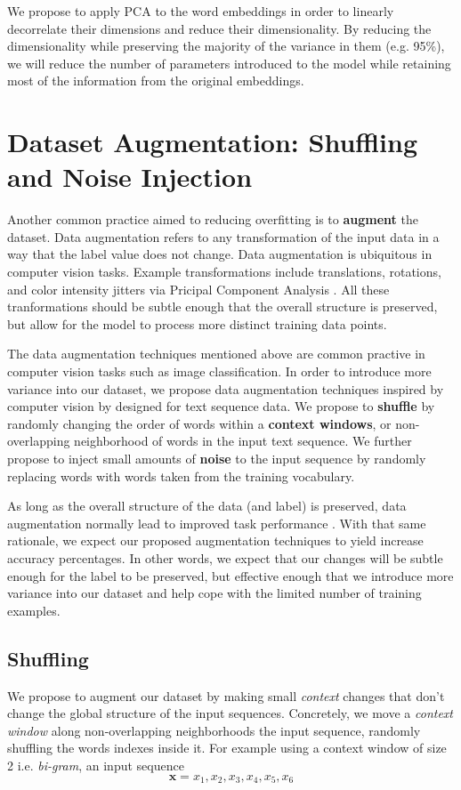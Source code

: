 We propose to apply PCA to the word embeddings in order to linearly decorrelate their dimensions and reduce their dimensionality.
By reducing the dimensionality while preserving the majority of the variance in them (e.g. 95\%), we will reduce the number of parameters introduced
to the model while retaining most of the information from the original embeddings.



\section{Dataset Augmentation: Shuffling and Noise Injection}
Another common practice aimed to reducing overfitting is to \textbf{augment} the dataset.
Data augmentation refers to any transformation of the input data in a way that
the label value does not change. Data augmentation is ubiquitous in computer vision tasks. Example transformations include translations,
rotations, and color intensity jitters via Pricipal Component Analysis \cite{krizhevsky2012imagenet}. All these tranformations should be subtle enough that the overall structure is preserved, but
allow for the model to process more distinct training data points.

The data augmentation techniques mentioned above are common practive in computer vision tasks such as image classification.
In order to introduce more variance into our dataset, we propose data augmentation techniques inspired by computer vision by designed for
text sequence data.
We propose to \textbf{shuffle} by randomly changing the order of words within a \textbf{context windows}, or non-overlapping neighborhood of words
in the input text sequence.
We further propose to inject small amounts of \textbf{noise} to the input sequence by randomly replacing words with words taken from the training vocabulary.

As long as the overall structure of the data (and label) is preserved, data augmentation normally lead to improved task performance \cite{chawla2002smote}
\cite{krizhevsky2012imagenet}\cite{jaderberg2015spatial}\cite{he2016deep}.
With that same rationale, we expect our proposed augmentation techniques to yield increase accuracy percentages. In other words, we expect that
our changes will be subtle enough for the label to be preserved, but effective enough that we introduce more variance into our dataset and help cope with
the limited number of training examples.


\subsection{Shuffling}
We propose to augment our dataset by making small \textit{context} changes that don't change the global structure
of the input sequences. Concretely, we move a \textit{context window} along non-overlapping neighborhoods the input sequence, randomly
shuffling the words indexes inside it. For example using a context window of size 2 i.e. \textit{bi-gram}, an input sequence
\[\bm{x} = x_1, x_2, x_3, x_4, x_5, x_6\]

